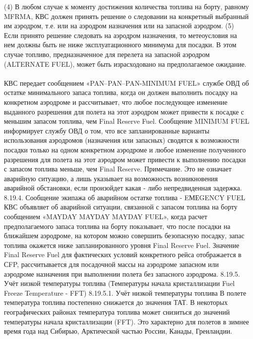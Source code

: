 (4) В любом случае к моменту достижения количества топлива на борту, равному MFRMA, КВС должен принять решение о следовании на конкретный выбранный им аэродром, т.е. или на аэродром назначения или на запасной аэродром.
(5) Если принято решение следовать на аэродром назначения, то метеоусловия на нем должны быть не ниже эксплуатационного минимума для посадки. В этом случае топливо, предназначенное для перелета на запасной аэродром (ALTERNATE FUEL), может быть израсходовано на предполагаемое ожидание.
\paragraph{} \label{par:1934}КВС передает сообщением «PAN–PAN–PAN-MINIMUM FUEL» службе ОВД об остатке минимального запаса топлива, когда он должен выполнить посадку на конкретном аэродроме и рассчитывает, что любое последующее изменение выданного разрешения для полета на этот аэродром может привести к посадке с меньшим запасом топлива, чем Final Reserve Fuel.
Сообщение MINIMUM FUEL информирует службу ОВД о том, что все запланированные варианты использования аэродромов (назначения или запасных) сводятся к возможности посадки только на одном конкретном аэродроме и любое изменение полученного разрешения для полета на этот аэродром может привести к выполнению посадки с запасом топлива меньше, чем Final Reserve.
Примечание. Это не означает аварийную ситуацию, а лишь указывает на возможность возникновения аварийной обстановки, если произойдет какая - либо непредвиденная задержка.
8.19.4.	Сообщение экипажа об аварийном остатке топлива - EМЕGENCY FUEL
КВС объявляет об аварийной ситуации, связанной с запасом топлива на борту сообщением «MAYDAY MAYDAY MAYDAY FUEL», когда расчет предполагаемого запаса топлива на борту показывает, что после посадки на ближайшем аэродроме, на котором можно совершить безопасную посадку, запас топлива окажется ниже запланированного уровня Final Reserve Fuel.
Значение Final Reserve Fuel для фактических условий конкретного рейса отображается в СFP, рассчитывается для посадочной массы на аэродроме запасном или аэродроме назначения при выполнении полета без запасного аэродрома.
8.19.5.	Учёт низкой температуры топлива (Температуры начала кристаллизации Fuel Freeze Temperature - FFT)
8.19.5.1. Учёт низкой температуры топлива В полете температура топлива постепенно снижается до значения ТАТ. В некоторых географических районах температура топлива может снизиться до значений температуры начала кристаллизации (FFT). Это характерно для полетов в зимнее время года над Сибирью, Арктической частью России, Канады, Гренландии.
